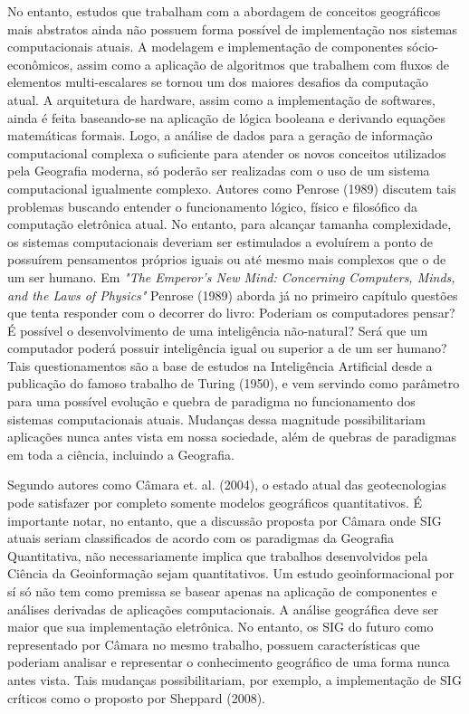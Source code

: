 No entanto, estudos que trabalham com a abordagem de conceitos geográficos mais abstratos ainda não possuem forma possível de implementação nos sistemas computacionais atuais. A modelagem e implementação de componentes sócio-econômicos, assim como a aplicação de algoritmos que trabalhem com fluxos de elementos multi-escalares se tornou um dos maiores desafios da computação atual. A arquitetura de hardware, assim como a implementação de softwares, ainda é feita baseando-se na aplicação de lógica booleana e derivando equações matemáticas formais. Logo, a análise de dados para a geração de informação computacional complexa o suficiente para atender os novos conceitos utilizados pela Geografia moderna, só poderão ser realizadas com o uso de um sistema computacional igualmente complexo. Autores como Penrose (1989)\cite{PENROSE} discutem tais problemas buscando entender o funcionamento lógico, físico e filosófico da computação eletrônica atual. No entanto, para alcançar tamanha complexidade, os sistemas computacionais deveriam ser estimulados a evoluírem a ponto de possuírem pensamentos próprios iguais ou até mesmo mais complexos que o de um ser humano. Em \textit{"The Emperor's New Mind: Concerning Computers, Minds, and the Laws of Physics"} Penrose (1989)\cite{PENROSE} aborda já no primeiro capítulo questões que tenta responder com o decorrer do livro: Poderiam os computadores pensar? É possível o desenvolvimento de uma inteligência não-natural? Será que um computador poderá possuir inteligência igual ou superior a de um ser humano? Tais questionamentos são a base de estudos na Inteligência Artificial desde a publicação do famoso trabalho de Turing (1950)\cite{TURING}, e vem servindo como parâmetro para uma possível evolução e quebra de paradigma no funcionamento dos sistemas computacionais atuais. Mudanças dessa magnitude possibilitariam aplicações nunca antes vista em nossa sociedade, além de quebras de paradigmas em toda a ciência, incluindo a Geografia.

Segundo autores como Câmara et. al. (2004)\cite{CAMARA_etal04}, o estado atual das geotecnologias pode satisfazer por completo somente modelos geográficos quantitativos. É importante notar, no entanto, que a discussão proposta por Câmara onde SIG atuais seriam classificados de acordo com os paradigmas da Geografia Quantitativa, não necessariamente implica que trabalhos desenvolvidos pela Ciência da Geoinformação sejam quantitativos. Um estudo geoinformacional por sí só não tem como premissa se basear apenas na aplicação de componentes e análises derivadas de aplicações computacionais. A análise geográfica deve ser maior que sua implementação eletrônica. No entanto, os SIG do futuro como representado por Câmara no mesmo trabalho, possuem características que poderiam analisar e representar o conhecimento geográfico de uma forma nunca antes vista. Tais mudanças possibilitariam, por exemplo, a implementação de SIG críticos como o proposto por Sheppard (2008)\cite{SHEPPARD}.

